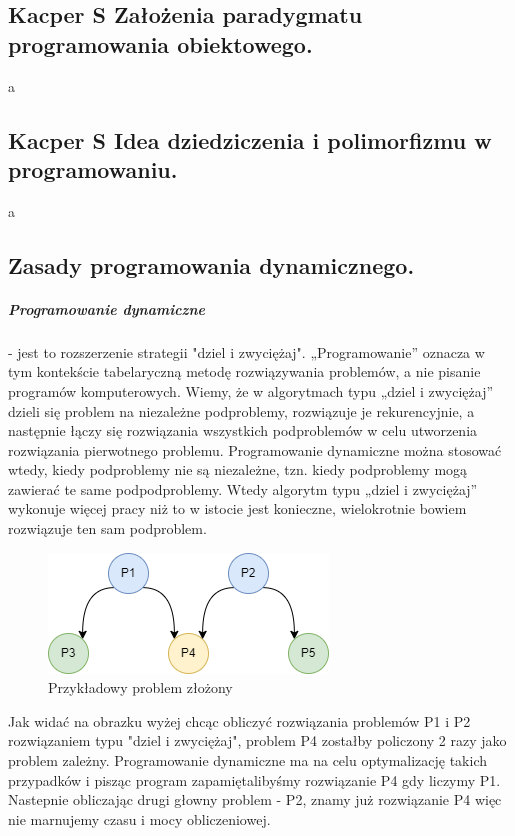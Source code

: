 \documentclass[a4paper,12pt,oneside]{book}
\begin{document}
			\subsection{\color{green} Kacper S \color{red}Założenia paradygmatu programowania obiektowego.}
				a
			\newpage\subsection{\color{green} Kacper S \color{red}Idea dziedziczenia i polimorfizmu w programowaniu.}
				a
			\newpage\subsection{Zasady programowania dynamicznego.}
				\subparagraph{Programowanie dynamiczne} - jest to rozszerzenie strategii "dziel i zwyciężaj". „Programowanie” oznacza w tym
				kontekście tabelaryczną metodę rozwiązywania problemów, a nie pisanie programów komputerowych. Wiemy, że w algorytmach typu „dziel i zwyciężaj” dzieli się problem na niezależne podproblemy, rozwiązuje je rekurencyjnie, a następnie łączy się rozwiązania
				wszystkich podproblemów w celu utworzenia rozwiązania pierwotnego problemu. Programowanie dynamiczne można stosować wtedy, kiedy podproblemy nie są niezależne, tzn. kiedy podproblemy mogą zawierać te same podpodproblemy. Wtedy algorytm typu „dziel i zwyciężaj” wykonuje więcej pracy niż to w istocie jest konieczne, wielokrotnie
				bowiem rozwiązuje ten sam podproblem. \\
				
				\begin{figure}[h!]
					\centering\includegraphics[scale=0.45]{problem_dynam.png}
					\caption{Przykładowy problem złożony}
				\end{figure}
			
				Jak widać na obrazku wyżej chcąc obliczyć rozwiązania problemów P1 i P2 rozwiązaniem typu "dziel i zwyciężaj", problem P4 zostałby policzony 2 razy jako problem zależny. Programowanie dynamiczne ma na celu optymalizację takich przypadków i pisząc program zapamiętalibyśmy rozwiązanie P4 gdy liczymy P1. Nastepnie obliczając drugi głowny problem - P2, znamy już rozwiązanie P4 więc nie marnujemy czasu i mocy obliczeniowej.\\
				
\end{document}
